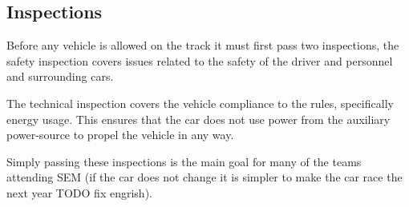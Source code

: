 \subsection{Inspections}
Before any vehicle is allowed on the track it must first pass two inspections, the safety inspection covers issues related to the safety of the driver and personnel and surrounding cars. 

The technical inspection covers the vehicle compliance to the rules, specifically energy usage. This ensures that the car does not use power from the auxiliary power-source to propel the vehicle in any way.

Simply passing these inspections is the main goal for many of the teams attending SEM (if the car does not change it is simpler to make the car race the next year TODO fix engrish).
